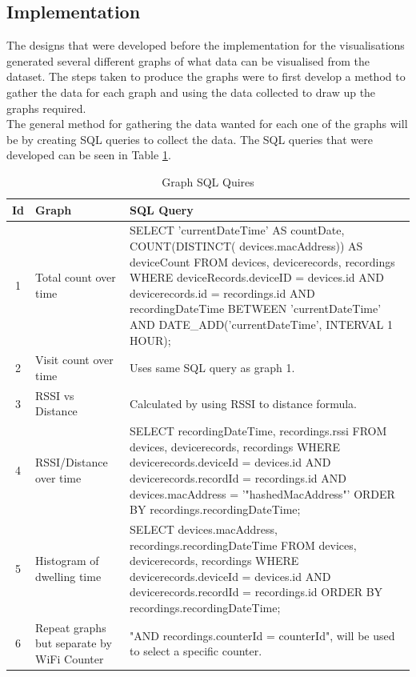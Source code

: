 \documentclass{report}
\begin{document}
\subsection{Implementation}
The designs that were developed before the implementation for the visualisations generated several different graphs of what data can be visualised from the dataset. The steps taken to produce the graphs were to first develop a method to gather the data for each graph and using the data collected to draw up the graphs required. \\ \newline
The general method for gathering the data wanted for each one of the graphs will be by creating SQL queries to collect the data. The SQL queries that were developed can be seen in Table \ref{tab:g_sql_queries}. 
\begin{table}[h]
    \begin{center}
        
    \def\arraystretch{1.5}
    \begin{tabular}{c p{4cm} p{12cm}}
    \hline
        Id & Graph & SQL Query\\
    \hline
        1 & Total count over time & SELECT 'currentDateTime' AS countDate, COUNT(DISTINCT( devices.macAddress)) AS deviceCount FROM devices, devicerecords, recordings WHERE deviceRecords.deviceID = devices.id AND devicerecords.id = recordings.id AND recordingDateTime BETWEEN 'currentDateTime' AND DATE\_ADD('currentDateTime', INTERVAL 1 HOUR);\\
        2 & Visit count over time &  Uses same SQL query as graph 1. \\
        3 & RSSI vs Distance & Calculated by using RSSI to distance formula.\\
        4 & RSSI/Distance over time & SELECT recordingDateTime, recordings.rssi FROM devices, devicerecords, recordings WHERE devicerecords.deviceId = devices.id AND devicerecords.recordId = recordings.id AND devices.macAddress = '"hashedMacAddress"' ORDER BY recordings.recordingDateTime;\\
        5 & Histogram of dwelling time & SELECT devices.macAddress, recordings.recordingDateTime FROM devices, devicerecords, recordings WHERE devicerecords.deviceId = devices.id AND devicerecords.recordId = recordings.id ORDER BY recordings.recordingDateTime;\\
        6 &  Repeat graphs but separate by WiFi Counter & "AND recordings.counterId = counterId", will be used to select a specific counter.\\
    \hline
    \end{tabular}
    \caption{Graph SQL Quires}
    \label{tab:g_sql_queries}
    \end{center}
\end{table} \\ 
\end{document}
